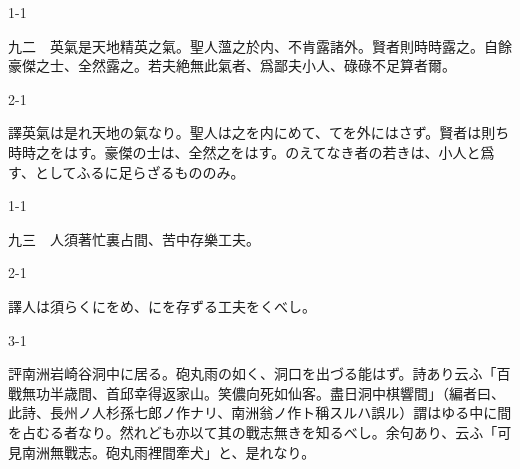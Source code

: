 \documentclass[tate,paper=b6j,jafontsize=9pt]{jlreq}
\begin{document}
\begin{azconvIndented}{1\zw}{-1\zw}

九二　英氣是天地精英之氣。聖人薀之於内、不肯露諸外。賢者則時時露之。自餘豪傑之士、全然露之。若夫絶無此氣者、爲鄙夫小人、碌碌不足算者爾。

\end{azconvIndented}
\begin{azconvIndented}{2\zw}{-1\zw}

譯英氣は是れ天地の氣なり。聖人は之を内にめて、てを外にはさず。賢者は則ち時時之をはす。豪傑の士は、全然之をはす。のえてなき者の若きは、小人と爲す、としてふるに足らざるもののみ。

\end{azconvIndented}

\begin{azconvIndented}{1\zw}{-1\zw}

九三　人須著忙裏占間、苦中存樂工夫。

\end{azconvIndented}
\begin{azconvIndented}{2\zw}{-1\zw}

譯人は須らくにをめ、にを存ずる工夫をくべし。

\end{azconvIndented}
\begin{azconvIndented}{3\zw}{-1\zw}

評南洲岩崎谷洞中に居る。砲丸雨の如く、洞口を出づる能はず。詩あり云ふ「百戰無功半歳間、首邱幸得返家山。笑儂向死如仙客。盡日洞中棋響間」（編者曰、此詩、長州ノ人杉孫七郎ノ作ナリ、南洲翁ノ作ト稱スルハ誤ル）謂はゆる中に間を占むる者なり。然れども亦以て其の戰志無きを知るべし。余句あり、云ふ「可見南洲無戰志。砲丸雨裡間牽犬」と、是れなり。

\end{azconvIndented}
\end{document}
